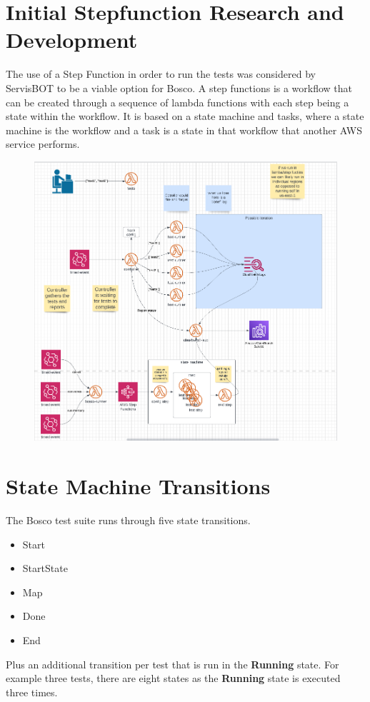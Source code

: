 \documentclass[12pt,a4paper,titlepage]{report}
\begin{document}
\section{Initial Stepfunction Research and Development}

The use of a Step Function in order to run the tests was considered by ServisBOT to be a viable option for Bosco. 
A step functions is a workflow that can be created through a sequence of lambda functions with each step being a state within
the workflow. It is based on a state machine and tasks, where a state machine is the workflow and a task is a
state in that workflow that another AWS service performs.

\begin{figure}[H]
 \centering
 \includegraphics[width=15cm]{./diagrams/possible_implementation}
\end{figure}

\section{State Machine Transitions}

The Bosco test suite runs through five state transitions. 
\begin{itemize}
  \item Start 
  \item StartState 
  \item Map 
  \item Done 
  \item End 
\end{itemize}
Plus an additional transition per test that is run in the \textbf{Running} state. 
For example three tests, there are eight states as the \textbf{Running} state is executed three times. 
\end{document}
